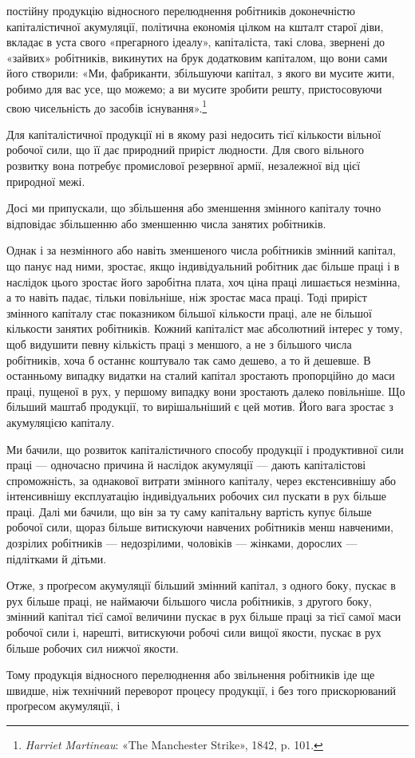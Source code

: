 постійну продукцію відносного перелюднення робітників доконечністю
капіталістичної акумуляції, політична економія цілком
на кшталт старої діви, вкладає в уста свого «прегарного
ідеалу», капіталіста, такі слова, звернені до «зайвих» робітників,
викинутих на брук додатковим капіталом, що вони сами його
створили: «Ми, фабриканти, збільшуючи капітал, з якого ви
мусите жити, робимо для вас усе, що можемо; а ви мусите зробити
решту, пристосовуючи свою чисельність до засобів існування».\footnote{
\emph{Harriet Martineau}: «The Manchester Strike», 1842, p. 101.
}

Для капіталістичної продукції ні в якому разі недосить тієї
кількости вільної робочої сили, що її дає природний приріст
людности. Для свого вільного розвитку вона потребує промислової
резервної армії, незалежної від цієї природної межі.

Досі ми припускали, що збільшення або зменшення змінного
капіталу точно відповідає збільшенню або зменшенню числа
занятих робітників.

Однак і за незмінного або навіть зменшеного числа робітників
змінний капітал, що панує над ними, зростає, якщо індивідуальний
робітник дає більше праці і в наслідок цього зростає
його заробітна плата, хоч ціна праці лишається незмінна, а то
навіть падає, тільки повільніше, ніж зростає маса праці. Тоді
приріст змінного капіталу стає показником більшої кількости
праці, але не більшої кількости занятих робітників. Кожний
капіталіст має абсолютний інтерес у тому, щоб видушити певну
кількість праці з меншого, а не з більшого числа робітників,
хоча б останнє коштувало так само дешево, а то й дешевше.
В останньому випадку видатки на сталий капітал зростають
пропорційно до маси праці, пущеної в рух, у першому випадку
вони зростають далеко повільніше. Що більший маштаб продукції,
то вирішальніший є цей мотив. Його вага зростає з акумуляцією
капіталу.

Ми бачили, що розвиток капіталістичного способу продукції
і продуктивної сили праці — одночасно причина й наслідок
акумуляції — дають капіталістові спроможність, за однакової витрати
змінного капіталу, через екстенсивнішу або інтенсивнішу
експлуатацію індивідуальних робочих сил пускати в рух більше
праці. Далі ми бачили, що він за ту саму капітальну вартість
купує більше робочої сили, щораз більше витискуючи навчених
робітників менш навченими, дозрілих робітників — недозрілими,
чоловіків — жінками, дорослих — підлітками й дітьми.

Отже, з проґресом акумуляції більший змінний капітал, з
одного боку, пускає в рух більше праці, не наймаючи більшого
числа робітників, з другого боку, змінний капітал тієї самої
величини пускає в рух більше праці за тієї самої маси робочої
сили і, нарешті, витискуючи робочі сили вищої якости, пускає
в рух більше робочих сил нижчої якости.

Тому продукція відносного перелюднення або звільнення
робітників іде ще швидше, ніж технічний переворот процесу
продукції, і без того прискорюваний проґресом акумуляції, і
\parbreak{}  %
